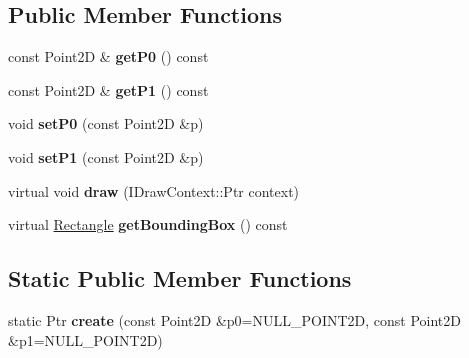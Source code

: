 \subsection*{Public Member Functions}
\begin{DoxyCompactItemize}
\item 
\hypertarget{classsambag_1_1disco_1_1graphic_elements_1_1_line_a3727db030fa17a0d5cf5df9727ce5ae6}{
const Point2D \& {\bfseries getP0} () const }
\label{classsambag_1_1disco_1_1graphic_elements_1_1_line_a3727db030fa17a0d5cf5df9727ce5ae6}

\item 
\hypertarget{classsambag_1_1disco_1_1graphic_elements_1_1_line_a1703c39b91eaf42fd5466bb15200fe6d}{
const Point2D \& {\bfseries getP1} () const }
\label{classsambag_1_1disco_1_1graphic_elements_1_1_line_a1703c39b91eaf42fd5466bb15200fe6d}

\item 
\hypertarget{classsambag_1_1disco_1_1graphic_elements_1_1_line_a8401d07ee56cf93964a3ae13a14b91ec}{
void {\bfseries setP0} (const Point2D \&p)}
\label{classsambag_1_1disco_1_1graphic_elements_1_1_line_a8401d07ee56cf93964a3ae13a14b91ec}

\item 
\hypertarget{classsambag_1_1disco_1_1graphic_elements_1_1_line_a787c9ca6921941056a05cd6312d352b6}{
void {\bfseries setP1} (const Point2D \&p)}
\label{classsambag_1_1disco_1_1graphic_elements_1_1_line_a787c9ca6921941056a05cd6312d352b6}

\item 
\hypertarget{classsambag_1_1disco_1_1graphic_elements_1_1_line_a6eb877467585625868d78011fa6d0af6}{
virtual void {\bfseries draw} (IDrawContext::Ptr context)}
\label{classsambag_1_1disco_1_1graphic_elements_1_1_line_a6eb877467585625868d78011fa6d0af6}

\item 
\hypertarget{classsambag_1_1disco_1_1graphic_elements_1_1_line_ab10f346535c46cc736f22bb1867ce901}{
virtual \hyperlink{classsambag_1_1com_1_1_rectangle}{Rectangle} {\bfseries getBoundingBox} () const }
\label{classsambag_1_1disco_1_1graphic_elements_1_1_line_ab10f346535c46cc736f22bb1867ce901}

\end{DoxyCompactItemize}
\subsection*{Static Public Member Functions}
\begin{DoxyCompactItemize}
\item 
\hypertarget{classsambag_1_1disco_1_1graphic_elements_1_1_line_a52321b2dbce8b58b4ad8bcb27a8a646e}{
static Ptr {\bfseries create} (const Point2D \&p0=NULL\_\-POINT2D, const Point2D \&p1=NULL\_\-POINT2D)}
\label{classsambag_1_1disco_1_1graphic_elements_1_1_line_a52321b2dbce8b58b4ad8bcb27a8a646e}

\end{DoxyCompactItemize}

